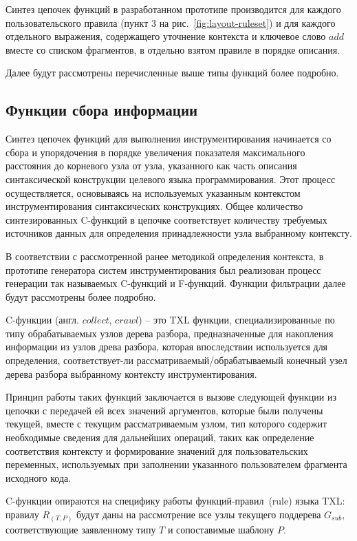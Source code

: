 Синтез цепочек функций в разработанном прототипе производится для каждого пользовательского правила (пункт 3 на рис.~\ref{fig:layout-ruleset}) и для каждого отдельного выражения, содержащего уточнение контекста и ключевое слово $add$ вместе со списком фрагментов, в отдельно взятом правиле в порядке описания.

Далее будут рассмотрены перечисленные выше типы функций более подробно.

\subsection{Функции сбора информации}

Синтез цепочек функций для выполнения инструментирования начинается со сбора и упорядочения в порядке увеличения показателя максимального расстояния до корневого узла от узла, указанного как часть описания синтаксической конструкции целевого языка программирования.
Этот процесс осуществляется, основываясь на используемых указанным контекстом инструментирования синтаксических конструкциях.
Общее количество синтезированных C-функций в цепочке соответствует количеству требуемых источников данных для определения принадлежности узла выбранному контексту.

В соответствии с рассмотренной ранее методикой определения контекста, в прототипе генератора систем инструментирования был реализован процесс генерации так называемых C-функций и F-функций.
Функции фильтрации далее будут рассмотрены более подробно.

C-функции (англ. $collect$, $crawl$) -- это TXL функции, специализированные по типу обрабатываемых узлов дерева разбора, предназначенные для накопления информации из узлов древа разбора, которая впоследствии используется для определения, соответствует-ли рассматриваемый/обрабатываемый конечный узел дерева разбора выбранному контексту инструментирования.

Принцип работы таких функций заключается в вызове следующей функции из цепочки с передачей ей всех значений аргументов, которые были получены текущей, вместе с текущим рассматриваемым узлом, тип которого содержит необходимые сведения для дальнейших операций, таких как определение соответствия контексту и формирование значений для пользовательских переменных, используемых при заполнении указанного пользователем фрагмента исходного кода.

C-функции опираются на специфику работы функций-правил~(rule) языка TXL: правилу $R_{(T,P)}$ будут даны на рассмотрение все узлы текущего поддерева $G_{sub}$, соответствующие заявленному типу $T$ и сопоставимые шаблону $P$.

